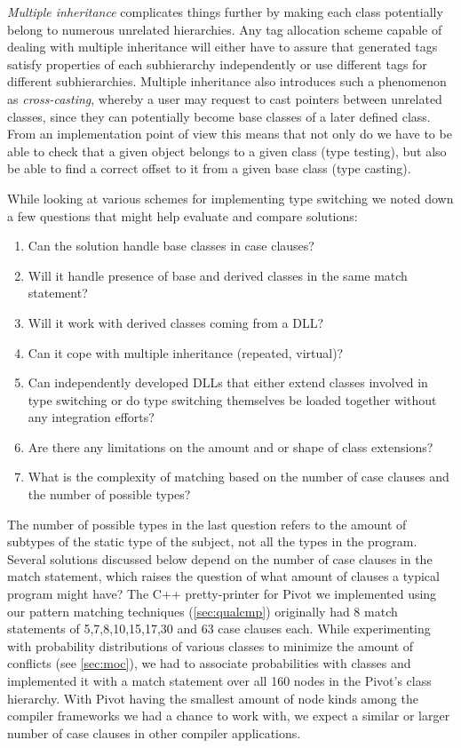 \documentclass[preprint]{sigplanconf}
\begin{document}
\emph{Multiple inheritance} complicates things further by making each class 
potentially belong to numerous unrelated hierarchies. Any tag allocation scheme 
capable of dealing with multiple inheritance will either have to assure that 
generated tags satisfy properties of each subhierarchy independently or use 
different tags for different subhierarchies. Multiple inheritance also 
introduces such a phenomenon as \emph{cross-casting}, whereby a user may request 
to cast pointers between unrelated classes, since they can potentially become 
base classes of a later defined class. From an implementation point of view this 
means that not only do we have to be able to check that a given object belongs 
to a given class (type testing), but also be able to find a correct offset to it 
from a given base class (type casting).

While looking at various schemes for implementing type switching we noted down a 
few questions that might help evaluate and compare solutions: 

\begin{enumerate}
\setlength{\itemsep}{0pt}
\setlength{\parskip}{0pt}
\item Can the solution handle base classes in case clauses?
\item Will it handle presence of base and derived classes in the same match statement?
\item Will it work with derived classes coming from a DLL?
\item Can it cope with multiple inheritance (repeated, virtual)?
\item Can independently developed DLLs that either extend classes involved in 
      type switching or do type switching themselves be loaded together without 
      any integration efforts?
\item Are there any limitations on the amount and or shape of class extensions?
\item What is the complexity of matching based on the number of case clauses and 
      the number of possible types?
\end{enumerate}

The number of possible types in the last question refers to the amount of subtypes 
of the static type of the subject, not all the types in the program. Several 
solutions discussed below depend on the number of case clauses in the match 
statement, which raises the question of what amount of clauses a typical program 
might have? The C++ pretty-printer for Pivot we implemented using our pattern 
matching techniques (\textsection\ref{sec:qualcmp}) originally had 8 match 
statements of 5,7,8,10,15,17,30 and 63 case clauses each. While experimenting 
with probability distributions of various classes to minimize the amount of 
conflicts (see \textsection\ref{sec:moc}), we had to associate probabilities 
with classes and implemented it with a match statement over all 160 nodes in the 
Pivot's class hierarchy. With Pivot having the smallest amount of node kinds 
among the compiler frameworks we had a chance to work with, we expect a similar 
or larger number of case clauses in other compiler applications.
\end{document}
